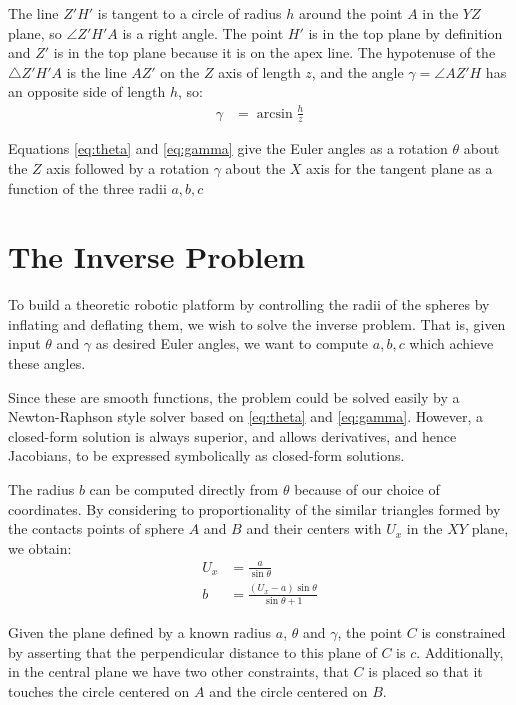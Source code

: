 \documentclass{article}
\begin{document}
The line $Z'H'$ is tangent to a circle of radius $h$ around the point $A$
in the $YZ$ plane, so $\angle Z'H'A$ is a right angle.
The point $H'$ is in the top plane by definition and $Z'$ is in the top plane
because it is on the apex line.
The hypotenuse of the $\triangle Z'H'A$ is the line $AZ'$ on the $Z$ axis of
length $z$, and the angle $\gamma = \angle AZ'H$ has an opposite side of length $h$,
so:
\begin{align}
  \gamma &= \arcsin{\frac{h}{z}} \label{eq:gamma}
\end{align}

Equations \ref{eq:theta} and \ref{eq:gamma} give the Euler angles
as a rotation $\theta$ about the $Z$ axis followed by a rotation $\gamma$ about the $X$ axis
for the tangent plane as a function of the three radii $a,b,c$

\section{The Inverse Problem}

To build a theoretic robotic platform by controlling the radii of the
spheres by inflating and deflating them, we wish to solve the inverse
problem. That is, given input $\theta$ and $\gamma$ as desired Euler
angles, we want to compute $a,b,c$ which achieve these angles.

Since these are smooth functions, the problem could be solved
easily by a Newton-Raphson style solver based on \ref{eq:theta} and \ref{eq:gamma}.
However, a closed-form solution is always superior, and allows derivatives,
and hence Jacobians, to be expressed symbolically as closed-form solutions.

The radius $b$ can be computed directly from $\theta$
because of our choice of coordinates.
By considering to proportionality of the similar triangles formed
by the contacts points of sphere $A$ and $B$ and their centers with $U_x$ in the $XY$ plane,
we obtain:
\begin{align}
  U_x &= \frac{a}{\sin{\theta}} \\
  b &= \frac{(U_x - a)\sin{\theta}}{\sin{\theta}+1}
\end{align}

\newcommand{\abs}[1]{ \left\lvert#1\right\rvert}

Given the plane defined by a known radius $a$, $\theta$ and $\gamma$,
the point $C$ is constrained by asserting that the perpendicular
distance to this plane of $C$ is $c$.
Additionally, in the central plane we have two other constraints,
that $C$ is placed so that it touches the circle centered on $A$ and
the circle centered on $B$.
\end{document}
